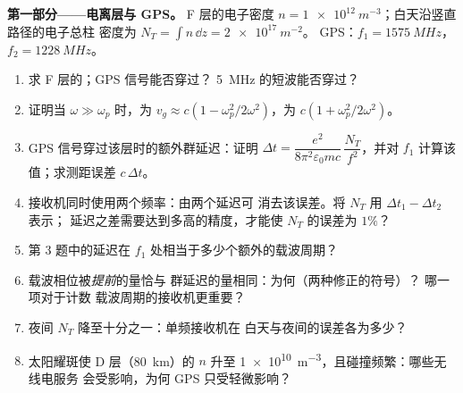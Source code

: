 \begin{problem}
\label{pb:b2:waves-in-media:1}

\medskip
\noindent\textbf{第一部分——电离层与 GPS。}
F 层的电子密度 $n = \qty{1e12}{m^{-3}}$；白天沿竖直路径的电子总柱
密度为 $N_T = \int n\,\dd z = \qty{2e17}{m^{-2}}$。
GPS：$f_1 = \qty{1575}{MHz}$，$f_2 = \qty{1228}{MHz}$。
\begin{enumerate}
  \item 求 F 层的；GPS 信号能否穿过？
        \qty{5}{MHz} 的短波能否穿过？
  \item 证明当 $\omega \gg \omega_p$ 时，为 $v_g \approx c(1 -
        \omega_p^2/2\omega^2)$，为 $c(1 + \omega_p^2/2\omega^2)$。
  \item GPS 信号穿过该层时的额外群延迟：证明
        $\Delta t = \dfrac{e^2}{8\pi^2\varepsilon_0mc}\,\dfrac{N_T}{f^2}$，并对
        $f_1$ 计算该值；求测距误差 $c\,\Delta t$。
  \item 接收机同时使用两个频率：由两个延迟可
        消去该误差。将 $N_T$ 用 $\Delta t_1 - \Delta t_2$ 表示；
        延迟之差需要达到多高的精度，才能使 $N_T$ 的误差为 $1\%$？
  \item 第 3 题中的延迟在
        $f_1$ 处相当于多少个额外的载波周期？
  \item 载波相位被\emph{提前}的量恰与
        群延迟的量相同：为何（两种修正的符号）？
        哪一项对于计数
        载波周期的接收机更重要？
  \item 夜间 $N_T$ 降至十分之一：单频接收机在
        白天与夜间的误差各为多少？
  \item 太阳耀斑使 D 层（\qty{80}{km}）的 $n$ 升至
        \qty{1e10}{m^{-3}}，且碰撞频繁：哪些无线电服务
        会受影响，为何 GPS 只受轻微影响？
\end{enumerate}


\end{problem}
